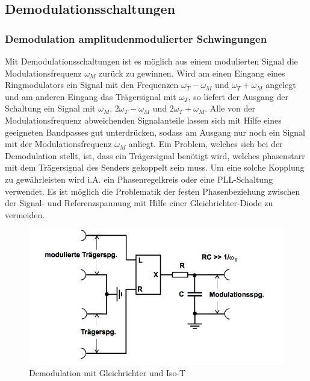 \subsection{Demodulationsschaltungen}
\subsubsection{Demodulation amplitudenmodulierter Schwingungen}
Mit Demodulationsschaltungen ist es möglich aus einem modulierten Signal die Modulationsfrequenz $\omega_M$ zurück zu gewinnen.
Wird am einen Eingang eines Ringmodulators ein Signal mit den Frequenzen $\omega_T - \omega_M$ und $\omega_T + \omega_M$ angelegt und am anderen Eingang das Trägersignal mit $\omega_T$, so liefert der Ausgang der Schaltung ein Signal mit
$\omega_M$, $2\omega_T - \omega_M$ und $2\omega_T + \omega_M$. Alle von der Modulationsfrequenz abweichenden Signalanteile lassen sich mit Hilfe eines geeigneten Bandpasses gut unterdrücken, sodass am Ausgang nur noch ein Signal mit der Modulationsfrequenz $\omega_M$ anliegt. Ein Problem, welches sich bei der Demodulation stellt, ist, dass ein Trägersignal benötigt wird, welches phasenstarr mit dem Trägersignal des Senders gekoppelt sein muss. Um eine solche Kopplung zu gewährleisten wird i.A. ein Phasenregelkreis oder eine PLL-Schaltung verwendet.
Es ist möglich die Problematik der festen Phasenbeziehung zwischen der Signal- und Referenzspannung mit Hilfe einer Gleichrichter-Diode
zu vermeiden.

\begin{figure}
	\centering
	\includegraphics[width=\textwidth]{img/Abb8.png}
	\caption{Demodulation mit Gleichrichter und Iso-T \cite{FP}}
	\label{iso-t}
\end{figure}


